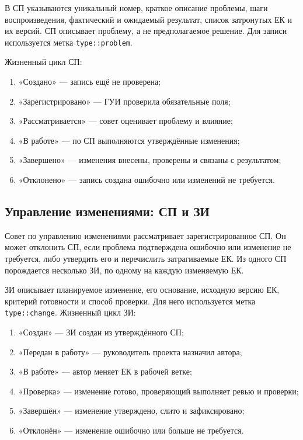 \documentclass{tpks}
\begin{document}
В СП указываются уникальный номер, краткое описание проблемы, шаги
воспроизведения, фактический и ожидаемый результат, список затронутых ЕК и их
версий. СП описывает проблему, а не предполагаемое решение. Для записи
используется метка \texttt{type::problem}.

Жизненный цикл СП:
\begin{enumerate}
  \item «Создано» --- запись ещё не проверена;
  \item «Зарегистрировано» --- ГУИ проверила обязательные поля;
  \item «Рассматривается» --- совет оценивает проблему и влияние;
  \item «В работе» --- по СП выполняются утверждённые изменения;
  \item «Завершено» --- изменения внесены, проверены и связаны с результатом;
  \item «Отклонено» --- запись создана ошибочно или изменений не требуется.
\end{enumerate}

\subsection{Управление изменениями: СП и ЗИ}

Совет по управлению изменениями рассматривает зарегистрированное СП. Он может
отклонить СП, если проблема подтверждена ошибочно или изменение не требуется,
либо утвердить его и перечислить затрагиваемые ЕК. Из одного СП порождается
несколько ЗИ, по одному на каждую изменяемую ЕК.

ЗИ описывает планируемое изменение, его основание, исходную версию ЕК, критерий
готовности и способ проверки. Для него используется метка \texttt{type::change}.
Жизненный цикл ЗИ:
\begin{enumerate}
  \item «Создан» --- ЗИ создан из утверждённого СП;
  \item «Передан в работу» --- руководитель проекта назначил автора;
  \item «В работе» --- автор меняет ЕК в рабочей ветке;
  \item «Проверка» --- изменение готово, проверяющий выполняет ревью и проверки;
  \item «Завершён» --- изменение утверждено, слито и зафиксировано;
  \item «Отклонён» --- изменение ошибочно или больше не требуется.
\end{enumerate}
\end{document}
